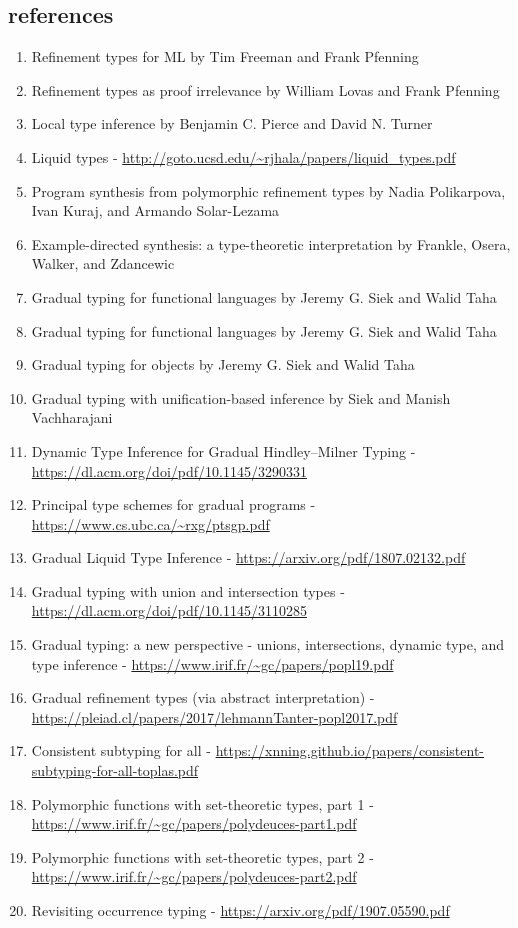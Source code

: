 \documentclass[sigplan,screen]{acmart}
\begin{document}
\subsection*{references}
\begin{enumerate}
\item Refinement types for ML by Tim Freeman and Frank Pfenning 
\item Refinement types as proof irrelevance by William Lovas and Frank Pfenning 
\item Local type inference by Benjamin C. Pierce and David N. Turner
\item Liquid types - \url{http://goto.ucsd.edu/~rjhala/papers/liquid_types.pdf}
\item Program synthesis from polymorphic refinement types by Nadia Polikarpova, Ivan Kuraj, and Armando Solar-Lezama
\item Example-directed synthesis: a type-theoretic interpretation by Frankle, Osera, Walker, and Zdancewic
\item Gradual typing for functional languages by Jeremy G. Siek and Walid Taha 
\item Gradual typing for functional languages by Jeremy G. Siek and Walid Taha 
\item Gradual typing for objects by Jeremy G. Siek and Walid Taha 
\item Gradual typing with unification-based inference by Siek and Manish Vachharajani 
\item Dynamic Type Inference for Gradual Hindley–Milner Typing - \url{https://dl.acm.org/doi/pdf/10.1145/3290331}
\item Principal type schemes for gradual programs - \url{https://www.cs.ubc.ca/~rxg/ptsgp.pdf}
\item Gradual Liquid Type Inference - \url{https://arxiv.org/pdf/1807.02132.pdf}
\item Gradual typing with union and intersection types - \url{https://dl.acm.org/doi/pdf/10.1145/3110285}
\item Gradual typing: a new perspective - unions, intersections, dynamic type, and type inference - \url{https://www.irif.fr/~gc/papers/popl19.pdf}
\item Gradual refinement types (via abstract interpretation) - \url{https://pleiad.cl/papers/2017/lehmannTanter-popl2017.pdf}
\item Consistent subtyping for all - \url{https://xnning.github.io/papers/consistent-subtyping-for-all-toplas.pdf}
\item Polymorphic functions with set-theoretic types, part 1 - \url{https://www.irif.fr/~gc/papers/polydeuces-part1.pdf}
\item Polymorphic functions with set-theoretic types, part 2 - \url{https://www.irif.fr/~gc/papers/polydeuces-part2.pdf}
\item Revisiting occurrence typing - \url{https://arxiv.org/pdf/1907.05590.pdf} 


\end{enumerate}
\end{document}
